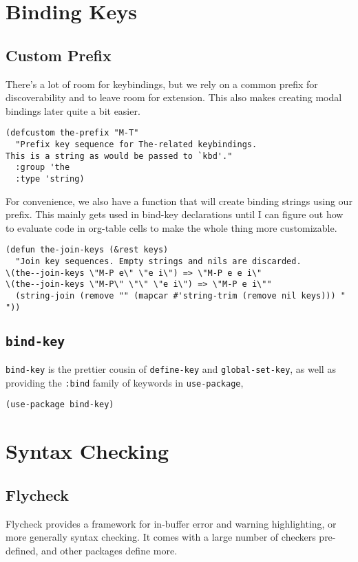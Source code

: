 \documentclass[11pt]{article}
\begin{document}
\section{Binding Keys}
\label{sec:org8ed077c}

\subsection{Custom Prefix}
\label{sec:orgda7d98c}
There's a lot of room for keybindings, but we rely on a common prefix
for discoverability and to leave room for extension. This also makes
creating modal bindings later quite a bit easier.

\begin{verbatim}
(defcustom the-prefix "M-T"
  "Prefix key sequence for The-related keybindings.
This is a string as would be passed to `kbd'."
  :group 'the
  :type 'string)
\end{verbatim}

For convenience, we also have a function that will create binding
strings using our prefix. This mainly gets used in bind-key
declarations until I can figure out how to evaluate code in org-table
cells to make the whole thing more customizable.

\begin{verbatim}
(defun the-join-keys (&rest keys)
  "Join key sequences. Empty strings and nils are discarded.
\(the--join-keys \"M-P e\" \"e i\") => \"M-P e e i\"
\(the--join-keys \"M-P\" \"\" \"e i\") => \"M-P e i\""
  (string-join (remove "" (mapcar #'string-trim (remove nil keys))) " "))
\end{verbatim}


\subsection{\texttt{bind-key}}
\label{sec:org5d6c4b9}
\texttt{bind-key} is the prettier cousin of \texttt{define-key} and
\texttt{global-set-key}, as well as providing the \texttt{:bind} family of keywords
in \texttt{use-package},

\begin{verbatim}
(use-package bind-key)
\end{verbatim}
\section{Syntax Checking}
\label{sec:org59b6cd6}
\subsection{Flycheck}
\label{sec:orgd66adf0}
Flycheck provides a framework for in-buffer error and warning
highlighting, or more generally syntax checking. It comes with a large
number of checkers pre-defined, and other packages define more.
\end{document}
